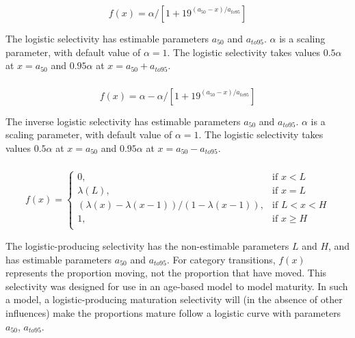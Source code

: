\subsubsection[Logistic]{}

\begin{equation}
  f(x) = \alpha / [1+19^{(a_{50}-x)/a_{to95}}]
\end{equation}
 
The logistic selectivity has estimable parameters $a_{50}$ and $a_{to95}$. $\alpha$ is a scaling parameter, with default value of $\alpha = 1$. The logistic selectivity takes values $0.5 \alpha$ at $x=a_{50}$ and $0.95 \alpha$ at $x=a_{50}+a_{to95}$. 

\subsubsection[Inverse logistic]{}

\begin{equation}
  f(x) = \alpha - \alpha / [1+19^{(a_{50}-x)/a_{to95}}]
\end{equation}
 
The inverse logistic selectivity has estimable parameters $a_{50}$ and $a_{to95}$. $\alpha$ is a scaling parameter, with default value of $\alpha = 1$. The logistic selectivity takes values $0.5 \alpha$ at $x=a_{50}$ and $0.95 \alpha$ at $x=a_{50}-a_{to95}$. 

\subsubsection[Logistic producing]{}

\begin{equation} 
f(x)=\begin{cases}
	  0, & \text{if $x < L$} \\
	  \lambda(L), & \text{if $x=L$} \\
	  \left( \lambda(x)-\lambda(x-1) \right) / \left( 1-\lambda(x-1) \right), & \text{if $L < x < H$} \\
	  1, & \text{if $x \ge H$} \\  
  \end{cases}
\end{equation}

The logistic-producing selectivity has the non-estimable parameters $L$ and $H$, and has estimable parameters $a_{50}$ and $a_{to95}$. For category transitions, $f(x)$ represents the proportion moving, not the proportion that have moved. This selectivity was designed for use in an age-based model to model maturity. In such a model, a logistic-producing maturation selectivity will (in the absence of other influences) make the proportions mature follow a logistic curve with parameters $a_{50}$, $a_{to95}$.

